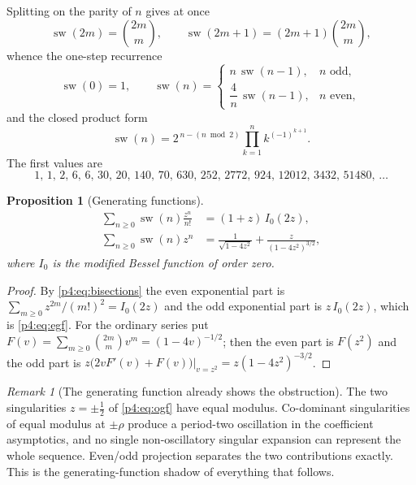 \documentclass[11pt,a4paper,oneside]{book}
\theoremstyle{plain}
\newtheorem{proposition}[theorem]{Proposition}
\theoremstyle{definition}
\theoremstyle{remark}
\newtheorem{remark}[theorem]{Remark}
\begin{document}
Splitting on the parity of $n$ gives at once
\begin{equation}
  \operatorname{sw}(2m)=\binom{2m}{m},
  \qquad
  \operatorname{sw}(2m+1)=(2m+1)\binom{2m}{m},
  \label{p4:eq:bisections}
\end{equation}
whence the one-step recurrence
\begin{equation}
  \operatorname{sw}(0)=1,
  \qquad
  \operatorname{sw}(n)=
  \begin{cases}
    n\,\operatorname{sw}(n-1), & n \text{ odd},\\[2pt]
    \dfrac4n\,\operatorname{sw}(n-1), & n \text{ even},
  \end{cases}
  \label{p4:eq:one-step}
\end{equation}
and the closed product form
\begin{equation}
  \operatorname{sw}(n)=2^{\,n-(n\bmod 2)}\prod_{k=1}^{n}k^{(-1)^{k+1}}.
  \label{p4:eq:swing-product}
\end{equation}
The first values are
\[
  1,\,1,\,2,\,6,\,6,\,30,\,20,\,140,\,70,\,630,\,252,\,2772,\,924,\,12012,
  \,3432,\,51480,\,\ldots
\]

\begin{proposition}[Generating functions]
\label{p4:prop:gf}
\begin{align}
  \sum_{n\ge0}\operatorname{sw}(n)\frac{z^n}{n!}&=(1+z)\,I_0(2z),
  \label{p4:eq:egf}\\
  \sum_{n\ge0}\operatorname{sw}(n)z^{n}
  &=\frac1{\sqrt{1-4z^2}}+\frac{z}{(1-4z^2)^{3/2}},
  \label{p4:eq:ogf}
\end{align}
where $I_0$ is the modified Bessel function of order zero.
\end{proposition}

\begin{proof}
By \cref{p4:eq:bisections} the even exponential part is
$\sum_{m\ge0}z^{2m}/(m!)^2=I_0(2z)$ and the odd exponential part is
$z\,I_0(2z)$, which is \cref{p4:eq:egf}.  For the ordinary series put
$F(v)=\sum_{m\ge0}\binom{2m}{m}v^m=(1-4v)^{-1/2}$; then the even part is
$F(z^2)$ and the odd part is
$z\bigl(2vF'(v)+F(v)\bigr)\big|_{v=z^2}=z(1-4z^2)^{-3/2}$.
\end{proof}

\begin{remark}[The generating function already shows the obstruction]
\label{p4:rem:codominance}
The two singularities $z=\pm\tfrac12$ of \cref{p4:eq:ogf} have equal modulus.
Co-dominant singularities of equal modulus at $\pm\rho$ produce a period-two
oscillation in the coefficient asymptotics, and no single non-oscillatory
singular expansion can represent the whole sequence.  Even/odd projection
separates the two contributions exactly.  This is the generating-function
shadow of everything that follows.
\end{remark}
\end{document}
